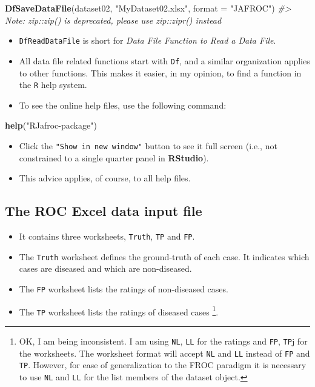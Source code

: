 \documentclass[]{book}
\newenvironment{Shaded}{\begin{snugshade}}{\end{snugshade}}
\newcommand{\CommentTok}[1]{\textcolor[rgb]{0.56,0.35,0.01}{\textit{#1}}}
\newcommand{\DataTypeTok}[1]{\textcolor[rgb]{0.13,0.29,0.53}{#1}}
\newcommand{\KeywordTok}[1]{\textcolor[rgb]{0.13,0.29,0.53}{\textbf{#1}}}
\newcommand{\NormalTok}[1]{#1}
\newcommand{\StringTok}[1]{\textcolor[rgb]{0.31,0.60,0.02}{#1}}
\providecommand{\tightlist}{%
  \setlength{\itemsep}{0pt}\setlength{\parskip}{0pt}}
\let\rmarkdownfootnote\footnote%
\def\footnote{\protect\rmarkdownfootnote}
\begin{document}
\begin{Shaded}
\begin{Highlighting}[]
\KeywordTok{DfSaveDataFile}\NormalTok{(dataset02, }\StringTok{"MyDataset02.xlsx"}\NormalTok{, }\DataTypeTok{format =} \StringTok{"JAFROC"}\NormalTok{)}
\CommentTok{#> Note: zip::zip() is deprecated, please use zip::zipr() instead}
\end{Highlighting}
\end{Shaded}

\begin{itemize}
\tightlist
\item
  \texttt{DfReadDataFile} is short for \emph{Data File Function to Read a Data File}.
\item
  All data file related functions start with \texttt{Df}, and a similar organization applies to other functions. This makes it easier, in my opinion, to find a function in the \texttt{R} help system.
\item
  To see the online help files, use the following command:
\end{itemize}

\begin{Shaded}
\begin{Highlighting}[]
\KeywordTok{help}\NormalTok{(}\StringTok{"RJafroc-package"}\NormalTok{)}
\end{Highlighting}
\end{Shaded}

\begin{itemize}
\tightlist
\item
  Click the \texttt{"Show\ in\ new\ window"} button to see it full screen (i.e., not constrained to a single quarter panel in \textbf{RStudio}).
\item
  This advice applies, of course, to all help files.
\end{itemize}

\hypertarget{the-roc-excel-data-input-file}{%
\subsection{The ROC Excel data input file}\label{the-roc-excel-data-input-file}}

\begin{itemize}
\tightlist
\item
  It contains three worksheets, \texttt{Truth}, \texttt{TP} and \texttt{FP}.
\item
  The \texttt{Truth} worksheet defines the ground-truth of each case. It indicates which cases are diseased and which are non-diseased.
\item
  The \texttt{FP} worksheet lists the ratings of non-diseased cases.
\item
  The \texttt{TP} worksheet lists the ratings of diseased cases \footnote{OK, I am being inconsistent. I am using \texttt{NL}, \texttt{LL} for the ratings and \texttt{FP}, \texttt{TP}j for the worksheets. The worksheet format will accept \texttt{NL} and \texttt{LL} instead of \texttt{FP} and \texttt{TP}. However, for ease of generalization to the FROC paradigm it is necessary to use \texttt{NL} and \texttt{LL} for the list members of the dataset object.}.
\end{itemize}
\end{document}
